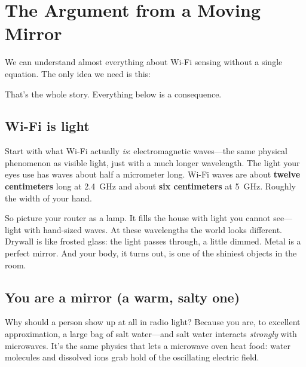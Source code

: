 \documentclass[11pt, letterpaper]{article}
\begin{document}

\section{The Argument from a Moving Mirror}

We can understand almost everything about Wi-Fi sensing without a single equation. The only idea we need is this:

\begin{center}
\end{center}

That's the whole story. Everything below is a consequence.

\subsection{Wi-Fi is light}

Start with what Wi-Fi actually \textit{is}: electromagnetic waves---the same physical phenomenon as visible light, just with a much longer wavelength. The light your eyes use has waves about half a micrometer long. Wi-Fi waves are about \textbf{twelve centimeters} long at 2.4~GHz and about \textbf{six centimeters} at 5~GHz. Roughly the width of your hand.

So picture your router as a lamp. It fills the house with light you cannot see---light with hand-sized waves. At these wavelengths the world looks different. Drywall is like frosted glass: the light passes through, a little dimmed. Metal is a perfect mirror. And your body, it turns out, is one of the shiniest objects in the room.

\subsection{You are a mirror (a warm, salty one)}

Why should a person show up at all in radio light? Because you are, to excellent approximation, a large bag of salt water---and salt water interacts \textit{strongly} with microwaves. It's the same physics that lets a microwave oven heat food: water molecules and dissolved ions grab hold of the oscillating electric field.
\end{document}
